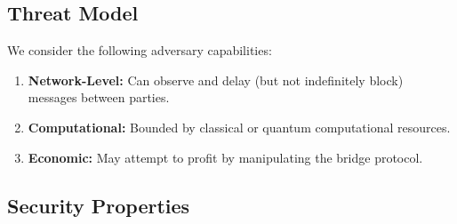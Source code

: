 \documentclass[11pt,a4paper]{article}
\begin{document}
\subsection{Threat Model}

We consider the following adversary capabilities:

\begin{enumerate}
    \item \textbf{Network-Level:} Can observe and delay (but not indefinitely block) messages between parties.
    \item \textbf{Computational:} Bounded by classical or quantum computational resources.
    \item \textbf{Economic:} May attempt to profit by manipulating the bridge protocol.
\end{enumerate}

\subsection{Security Properties}
\end{document}
